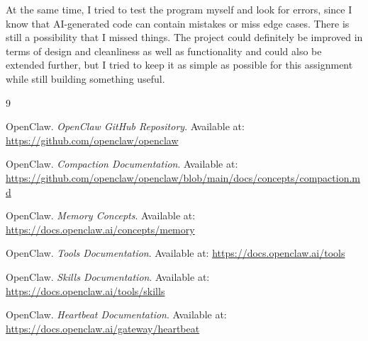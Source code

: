 \documentclass[10pt,a4paper]{article}
\begin{document}
At the same time, I tried to test the program myself and look for errors, since I know that AI-generated code can contain mistakes or miss edge cases. There is still a possibility that I missed things. The project could definitely be improved in terms of design and cleanliness as well as functionality and could also be extended further, but I tried to keep it as simple as possible for this assignment while still building something useful.

\begin{thebibliography}{9}

OpenClaw. \textit{OpenClaw GitHub Repository}. Available at:
\url{https://github.com/openclaw/openclaw}

OpenClaw. \textit{Compaction Documentation}. Available at:
\url{https://github.com/openclaw/openclaw/blob/main/docs/concepts/compaction.md}

OpenClaw. \textit{Memory Concepts}. Available at:
\url{https://docs.openclaw.ai/concepts/memory}

OpenClaw. \textit{Tools Documentation}. Available at:
\url{https://docs.openclaw.ai/tools}

OpenClaw. \textit{Skills Documentation}. Available at:
\url{https://docs.openclaw.ai/tools/skills}

OpenClaw. \textit{Heartbeat Documentation}. Available at:
\url{https://docs.openclaw.ai/gateway/heartbeat}

\end{thebibliography}
\end{document}
